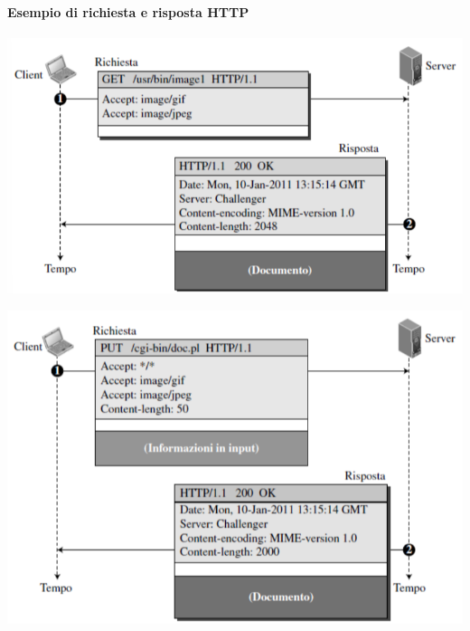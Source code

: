 \documentclass[12pt]{report}
\begin{document}
	\paragraph{Esempio di richiesta e risposta HTTP}
	\begin{center}
		\includegraphics[scale=0.5]{assets/http-req-res.png}
	\end{center}
	\begin{center}
		\includegraphics[scale=0.5]{assets/http-req-res2.png}
	\end{center}
\end{document}
